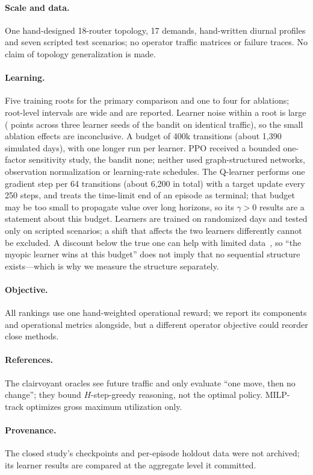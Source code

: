 \paragraph{Scale and data.} One hand-designed 18-router topology, 17 demands,
hand-written diurnal profiles and seven scripted test scenarios; no operator
traffic matrices or failure traces. No claim of topology generalization is
made.

\paragraph{Learning.} Five training roots for the primary comparison and
one to four for ablations; root-level intervals are wide and are reported.
Learner noise within a root is large (\NoiseBanditSpread{} points across three
learner seeds of the bandit on identical traffic), so the small ablation
effects are inconclusive.
A budget of 400k transitions (about 1{,}390 simulated days), with one longer
run per learner. PPO received a bounded one-factor sensitivity study, the
bandit none; neither used graph-structured networks, observation
normalization or learning-rate schedules. The Q-learner performs one gradient
step per 64 transitions (about 6{,}200 in total) with a target update every 250
steps, and treats the time-limit end of an episode as terminal; that budget
may be too small to propagate value over long horizons, so its $\gamma>0$
results are a statement about this budget. Learners are trained on
randomized days and tested only on scripted scenarios; a shift that affects
the two learners differently cannot be excluded. A discount below the true one can
help with limited data~\citep{jiang2015horizon,amit2020discount}, so ``the
myopic learner wins at this budget'' does not imply that no sequential
structure exists---which is why we measure the structure separately.

\paragraph{Objective.} All rankings use one hand-weighted operational reward;
we report its components and operational metrics alongside, but a different
operator objective could reorder close methods.

\paragraph{References.} The clairvoyant oracles see future traffic and only
evaluate ``one move, then no change''; they bound $H$-step-greedy reasoning, not
the optimal policy. MILP-track optimizes gross maximum utilization only.

\paragraph{Provenance.} The closed study's checkpoints and per-episode
holdout data were not archived; its learner results are compared at the
aggregate level it committed.
